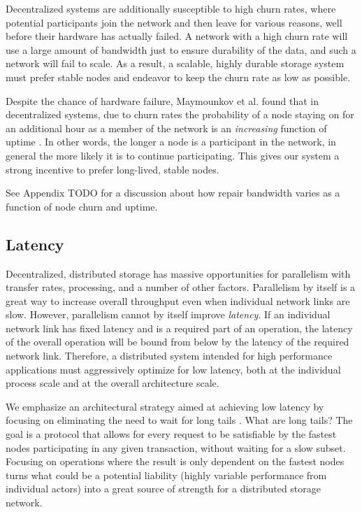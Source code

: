 \documentclass[a4paper,10pt]{article} \usepackage[utf8]{inputenc}
\newcommand{\todo}[1]{{\color{red} TODO #1 }}
\begin{document}
Decentralized systems are additionally susceptible to high churn rates, where
potential participants join the network and then leave for various reasons, well
before their hardware has actually failed. A network with a high churn rate will
use a large amount of bandwidth just to ensure durability of the data, and such
a network will fail to scale. As a result, a scalable, highly durable storage
system must prefer stable nodes and endeavor to keep the churn rate as low as
possible.

Despite the chance of hardware failure, Maymounkov et al. found that in
decentralized systems, due to churn rates the probability of a node staying on
for an additional hour as a member of the network is an {\em increasing}
function of uptime \cite{kad}. In other words, the longer a node is a
participant in the network, in general the more likely it is to continue
participating. This gives our system a strong incentive to prefer long-lived,
stable nodes.

See Appendix \todo{} for a discussion about how repair bandwidth varies as a
function of node churn and uptime.

\subsection{Latency}

Decentralized, distributed storage has massive opportunities for parallelism
with transfer rates, processing, and a number of other factors. Parallelism by
itself is a great way to increase overall throughput even when individual
network links are slow. However, parallelism cannot by itself improve {\em
latency}. If an individual network link has fixed latency and is a required part
of an operation, the latency of the overall operation will be bound from below
by the latency of the required network link. Therefore, a distributed system
intended for high performance applications must aggressively optimize for low
latency, both at the individual process scale and at the overall architecture
scale.

We emphasize an architectural strategy aimed at achieving low latency by
focusing on eliminating the need to wait for long tails \cite{tail-at-scale}.
{\color{red}What are long tails?}
The goal is a protocol that allows for every request to be satisfiable by the
fastest nodes participating in any given transaction, without waiting for a slow
subset. Focusing on operations where the result is only dependent on the fastest
nodes turns what could be a potential liability (highly variable performance
from individual actors) into a great source of strength for a distributed
storage network.
\end{document}
